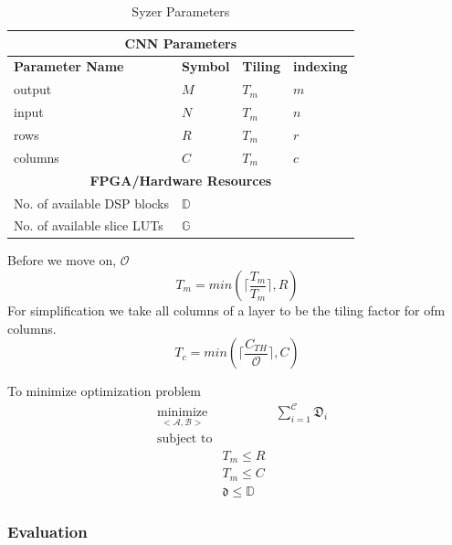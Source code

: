 \documentclass[letterpaper,12pt]{article}
\begin{document}
\begin{table}[htbp]
\caption{Syzer Parameters}
\begin{tabular}{|p{7cm}|p{3cm}|p{2.3cm}|p{2.3cm}|}
\hline \multicolumn{4}{|c|}{\textbf{CNN Parameters}} \\
\hline \textbf{Parameter Name} & \textbf{Symbol} & \textbf{Tiling} &  \textbf{indexing}\\
\hline output  &  $M$ & $T_m$ & $m$  \\
\hline  input  &  $N$ & $T_m$ & $n$ \\
\hline  rows &  $R$ & $T_m$ & $r$ \\
\hline columns &  $C$ & $T_m$ & $c$ \\
\hline \multicolumn{4}{|c|}{\textbf{FPGA/Hardware Resources}} \\
\hline No. of available DSP blocks  & $\mathbb{D}$ & &\\
\hline No. of available slice LUTs & $\mathbb{G}$ & &\\
\hline 
\end{tabular}
\label{tab1}
\end{table}

Before we move on, $\mathcal{O}$
\begin{equation}
T_m = min(\lceil\frac{T_m}{T_m}\rceil,R) \label{tr}
\end{equation}
For simplification we take all columns of a layer to be the tiling factor for ofm columns.
\begin{equation}
T_c = min(\lceil\frac{C_{TH}}{\mathcal{O}}\rceil,C)
\label{tc}
\end{equation}

To minimize optimization problem
\begin{equation*}
\begin{aligned}
& \underset{<\mathcal{A},\mathcal{B}>}{\text{minimize}}
& & \sum_{i=1}^{\mathcal{C}}{\mathfrak{D}_{i}} \\
& \text{subject to} \\
& & T_m \leq R\\
& & T_m \leq C\\
& & \mathfrak{d} \leq \mathbb{D}
\label{resourceopt}\end{aligned}
\end{equation*}

\subsubsection{Evaluation}


\pagebreak 
\end{document}
